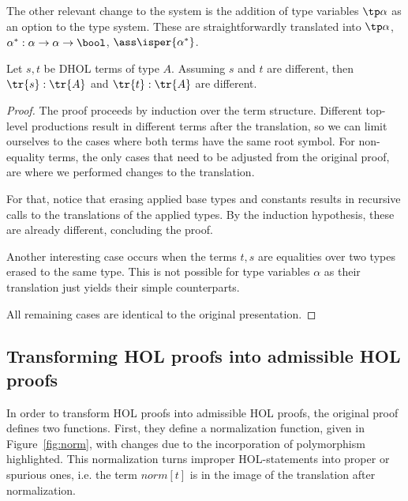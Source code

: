 The other relevant change to the system is the addition of type variables \(\tp\alpha\) as an
option to the type system. These are straightforwardly translated into \(\tp\alpha\),
\(\alpha^*:\alpha\to\alpha\to\bool\), \(\ass \isper{\alpha^*}\). 
\begin{lemma}
  \label{lem:tyInj}
  Let \(s, t\) be DHOL terms of type \(A\). Assuming \(s\) and \(t\) are different, then
  \(\tr{s}:\tr{A}\) and \(\tr{t}:\tr{A}\) are different. 
\end{lemma}

\begin{proof}
  The proof proceeds by induction over the term structure. Different top-level productions
  result in different terms after the translation, so we can limit ourselves to the cases where
  both terms have the same root symbol. For non-equality terms, the only cases that need to be
  adjusted from the original proof, are where we performed changes to the translation.

  For that, notice that erasing applied base types and constants results in recursive calls
  to the translations of the applied types. By the induction hypothesis, these are already
  different, concluding the proof.

  Another interesting case occurs when the terms \(t, s\) are equalities over two types 
  erased to the same type. This is not possible for type variables \(\alpha\) as their
  translation just yields their simple counterparts.

  All remaining cases are identical to the original presentation.
\end{proof}

\subsection{Transforming HOL proofs into admissible HOL proofs}
In order to transform HOL proofs into admissible HOL proofs, the original proof defines two
functions.
First, they define a normalization function, given in Figure~\ref{fig:norm}, with changes
due to the incorporation of polymorphism highlighted. This normalization turns improper
HOL-statements into proper or spurious ones, i.e. the term \(norm[t]\) is
in the image of the translation after normalization.

